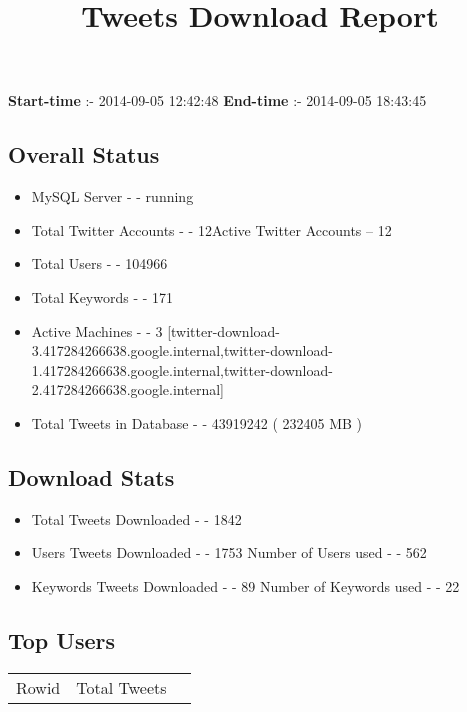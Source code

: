 \documentclass{article}\usepackage[T1]{fontenc}
\begin{document}
\title{\textbf{Tweets Download Report}}
               \date{}
                \maketitle
               \centerline{\textbf{Start-time} :- 2014-09-05 12:42:48 \hspace{40pt} \textbf{End-time} :- 2014-09-05 18:43:45}               \subsection*{Overall Status}                \begin{itemize}                \item MySQL Server - - running               \item Total Twitter Accounts - - 12\newline Active Twitter Accounts -- 12               \item Total Users - - 104966               \item Total Keywords - - 171               \item Active Machines - - 3 [twitter-download-3.417284266638.google.internal,twitter-download-1.417284266638.google.internal,twitter-download-2.417284266638.google.internal]               \item Total Tweets in Database - - 43919242 ( 232405 MB )               \end{itemize}               \subsection*{Download Stats}                \begin{itemize}                \item Total Tweets Downloaded - - 1842               \item Users Tweets Downloaded - - 1753 \newline Number of Users used - - 562               \item Keywords Tweets Downloaded - - 89 \newline Number of Keywords used - - 22              \end{itemize}              \subsection*{Top Users}\begin{tabular}{|c|c|c|}         \hline         Rowid & Total Tweets \\ 

\end{tabular}
\end{document}
